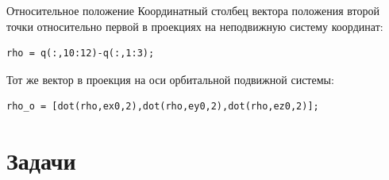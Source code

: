 \documentclass[12pt, compress]{beamer}
\begin{document}
\begin{frame}[fragile]{Относительное положение}
Координатный столбец вектора положения второй точки относительно первой в проекциях на неподвижную систему координат:
\begin{lstlisting}
rho = q(:,10:12)-q(:,1:3);
\end{lstlisting}
Тот же вектор в проекция на оси орбитальной подвижной системы:
\begin{lstlisting}
rho_o = [dot(rho,ex0,2),dot(rho,ey0,2),dot(rho,ez0,2)];
\end{lstlisting}
\end{frame}







%
%
\section{Задачи}
%
%
%
\end{document}
